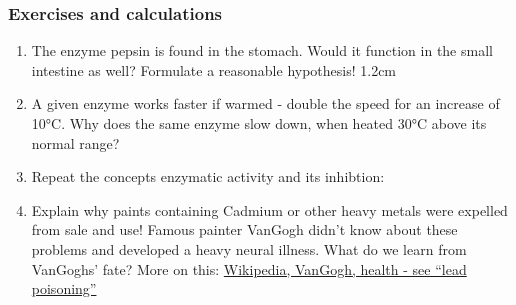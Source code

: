 		
		
	\clearpage
  \areaset[0cm]{11.5cm}{26.5cm}  
% 				

	\subsubsection{Exercises and calculations}
				\begin{enumerate}[itemsep=1.5em, leftmargin=*]


		 		\item  The enzyme pepsin is found in the stomach. Would it function in the small intestine as well? Formulate a reasonable hypothesis!
				 {1.2cm}

				\item A given enzyme works faster if warmed - double the speed for an increase of 10°C. Why does the same enzyme slow down, when heated 30°C above its normal range?
		
				\item Repeat the concepts enzymatic activity and its inhibtion: 
				
				
				
				\item Explain why paints containing Cadmium or other heavy metals were expelled from sale and use! Famous painter VanGogh didn't know about these problems and developed a heavy neural illness. What do we learn from VanGoghs' fate? More on this: \href{http://en.wikipedia.org/wiki/Vincent_van_Gogh\%27s_health}{Wikipedia, VanGogh, health - see "`lead poisoning"'}
					
					

\end{enumerate}
